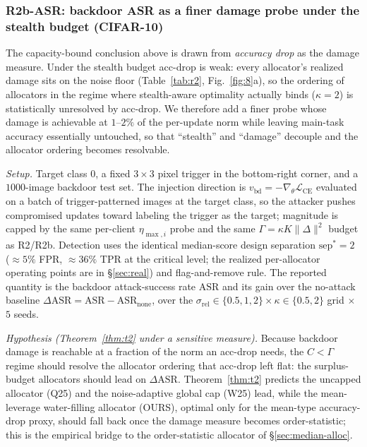 \documentclass[final,1p,times]{elsarticle}
\begin{document}
\subsubsection{R2b-ASR: backdoor ASR as a finer damage probe under the stealth budget (CIFAR-10)}
\label{sec:r2bd}
The capacity-bound conclusion above is drawn from \emph{accuracy drop} as the
damage measure. Under the stealth budget acc-drop is weak: every allocator's
realized damage sits on the noise floor (Table~\ref{tab:r2},
Fig.~\ref{fig:8}a), so the ordering of allocators in the regime where
stealth-aware optimality actually binds ($\kappa{=}2$) is statistically
unresolved by acc-drop. We therefore add a finer probe whose damage is
achievable at $1$--$2\%$ of the per-update norm while leaving main-task
accuracy essentially untouched, so that ``stealth'' and ``damage'' decouple and
the allocator ordering becomes resolvable.

\emph{Setup.} Target class $0$, a fixed $3{\times}3$ pixel trigger in the
bottom-right corner, and a $1000$-image backdoor test set. The injection
direction is $v_{\mathrm{bd}}{=}-\nabla_{\theta}\mathcal{L}_{\mathrm{CE}}$
evaluated on a batch of trigger-patterned images at the target class, so the
attacker pushes compromised updates toward labeling the trigger as the target;
magnitude is capped by the same per-client $\eta_{\max,i}$ probe and the same
$\Gamma{=}\kappa K\|\Delta\|^{2}$ budget as R2/R2b. Detection uses the identical
median-score design separation $\mathrm{sep}^{*}{=}2$ ($\approx 5\%$ FPR,
$\approx 36\%$ TPR at the critical level; the realized per-allocator operating
points are in \S\ref{sec:real}) and flag-and-remove rule. The reported quantity
is the backdoor attack-success rate $\mathrm{ASR}$ and its gain over the
no-attack baseline $\Delta\mathrm{ASR}{=}\mathrm{ASR}{-}\mathrm{ASR}_{\mathrm{none}}$,
over the $\sigma_{\mathrm{rel}}{\in}\{0.5,1,2\}\times\kappa{\in}\{0.5,2\}$
grid $\times$ $5$ seeds.

\emph{Hypothesis (Theorem~\ref{thm:t2} under a sensitive measure).} Because
backdoor damage is reachable at a fraction of the norm an acc-drop needs, the
$C{<}\Gamma$ regime should resolve the allocator ordering that acc-drop
left flat: the surplus-budget allocators should lead on $\Delta\mathrm{ASR}$.
Theorem~\ref{thm:t2} predicts the uncapped allocator (Q25) and the
noise-adaptive global cap (W25) lead, while the mean-leverage water-filling
allocator (OURS), optimal only for the mean-type accuracy-drop proxy,
should fall back once the damage measure becomes order-statistic; this
is the empirical bridge to the order-statistic allocator of
\S\ref{sec:median-alloc}.
\end{document}
